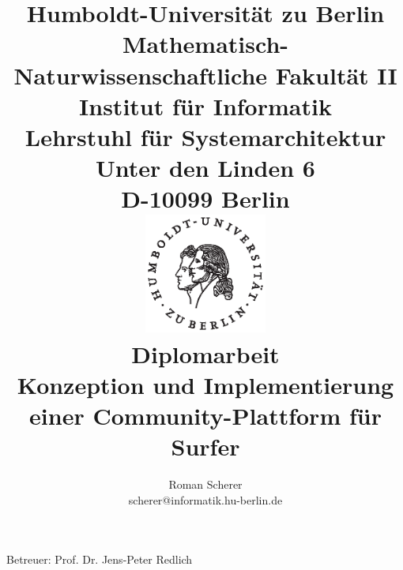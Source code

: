 \documentclass[12pt,a4paper,ngerman]{article}
\author{Roman Scherer \\ scherer@informatik.hu-berlin.de}
\title{{\small
    Humboldt-Universität zu Berlin \\
    Mathematisch-Naturwissenschaftliche Fakultät II \\
    Institut für Informatik \\
    Lehrstuhl für Systemarchitektur \\
    Unter den Linden 6 \\
    D-10099 Berlin \\
  } \vspace{0.4cm}
  \includegraphics[width=4cm]{bilder/husiegel_sw_op} \\
  \vspace{0.4cm}
  \large{Diplomarbeit} \\
  \LARGE{\textbf{Konzeption und Implementierung einer Community-Plattform für Surfer}} \\
}
\begin{document}
\maketitle

\begin{center}
  Betreuer: Prof. Dr. Jens-Peter Redlich
\end{center}






\end{document}
